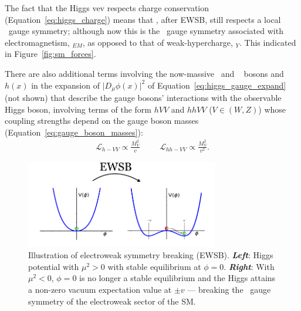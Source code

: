 The fact that the Higgs vev respects charge conservation (Equation~\ref{eq:higgs_charge}) means
that \SML, after EWSB, still respects a local \Uone~gauge symmetry; although now
this is the \Uone~gauge symmetry associated with electromagnetism, \Uone$_{EM}$,
as opposed to that of weak-hypercharge, \Uone$_Y$. This indicated in Figure~\ref{fig:sm_forces}.

There are also additional terms involving the now-massive \fieldWpm~and \fieldZ~ bosons and $h(x)$ in the expansion of $\lvert D_{\mu}\phi(x)\rvert^2$ of
Equation~\ref{eq:higgs_gauge_expand} (not shown) that describe the gauge bosons' interactions with the observable Higgs boson,
involving terms of the form $hVV$ and $hhVV$ ($V\in(W,Z)$) whose coupling strengths depend
on the gauge boson masses (Equation~\ref{eq:gauge_boson_masses}):
\begin{align}
	\mathcal{L}_{h-VV} \propto \frac{M_V^2}{v} \hspace{1cm} \mathcal{L}_{hh-VV} \propto \frac{M_V^2}{v^2}.
	\label{eq:higgs_gauge_couplings}
\end{align}
\begin{figure}[!htb]
	\begin{center}
		\includegraphics[width=0.75\textwidth]{figures/chapter1/higgs_potential_trans}
		\caption{Illustration of electroweak symmetry breaking (EWSB).
			\textbf{\textit{Left}}: Higgs potential with $\mu^2>0$ with stable equilibrium at $\phi=0$.
			\textbf{\textit{Right}}: With $\mu^2<0$, $\phi=0$ is no longer
			a stable equilibrium and the Higgs attains a non-zero vacuum
			expectation value at $\pm v$ --- breaking the \SUewk~gauge symmetry of the electroweak
			sector of the SM.
		}
	\label{fig:higgs_ewsb}
	\end{center}
\end{figure}

